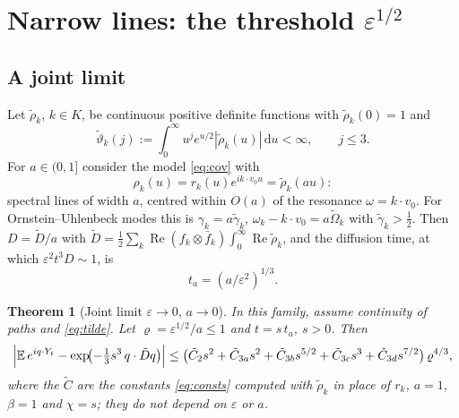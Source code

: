 \documentclass[11pt]{article}
\newcommand{\dd}{\mathrm{d}}
\newcommand{\E}{\mathbb{E}}
\newcommand{\eps}{\varepsilon}
\renewcommand{\Re}{\operatorname{Re}}
\newcommand{\rhoeff}{\varrho}
\newtheorem{theorem}{Theorem}
\theoremstyle{remark}
\begin{document}
\section{Narrow lines: the threshold $\eps^{1/2}$}

\subsection{A joint limit}

Let $\tilde\rho_k$, $k\in K$, be continuous positive definite functions with
$\tilde\rho_k(0)=1$ and
\begin{equation}
  \tilde\vartheta_k(j) := \int_0^\infty u^je^{u/2}|\tilde\rho_k(u)|\,\dd u<\infty,
  \qquad j\le3 .
  \label{eq:tilde}
\end{equation}
For $a\in(0,1]$ consider the model \eqref{eq:cov} with
\begin{equation}
  \rho_k(u) = r_k(u)e^{ik\cdot v_0u} = \tilde\rho_k(a u):
\end{equation}
spectral lines of width $a$, centred within $O(a)$ of the resonance
$\omega = k\cdot v_0$. For Ornstein--Uhlenbeck modes this is
$\gamma_k = a\tilde\gamma_k$, $\omega_k-k\cdot v_0 = a\tilde\Omega_k$ with
$\tilde\gamma_k>\frac12$. Then $D = \tilde D/a$ with
$\tilde D = \frac12\sum_k\Re(f_k\otimes\bar f_k)\int_0^\infty\Re\tilde\rho_k$,
and the diffusion time, at which $\eps^2t^3D\sim1$, is
\begin{equation}
  t_a = (a/\eps^2)^{1/3}.
\end{equation}

\begin{theorem}[Joint limit $\eps\to0$, $a\to0$]\label{thm:joint}
In this family, assume continuity of paths and \eqref{eq:tilde}. Let
$\rhoeff = \eps^{1/2}/a\le1$ and $t = s\,t_a$, $s>0$. Then
\begin{equation}
  \Bigl|\E\,e^{iq\cdot Y_t}-\exp\!\bigl(-\tfrac13s^3\,q\cdot\tilde Dq\bigr)\Bigr|
  \le\bigl(\tilde C_2s^2+\tilde C_{3a}s^2+\tilde C_{3b}s^{5/2}
     +\tilde C_{3c}s^3+\tilde C_{3d}s^{7/2}\bigr)\,\rhoeff^{4/3},
\end{equation}
where the $\tilde C$ are the constants \eqref{eq:consts} computed with
$\tilde\rho_k$ in place of $r_k$, $a=1$, $\beta=1$ and $\chi = s$; they do
not depend on $\eps$ or $a$.
\end{theorem}
\end{document}
